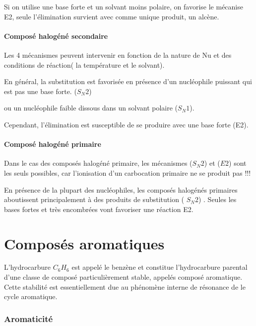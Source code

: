 Si on utilise une base forte et un solvant moins polaire, on favorise le mécanise E2, seule l'élimination survient avec comme unique produit, un alcène.


\subsection{Composé halogéné secondaire}

Les 4 mécanismes peuvent intervenir en fonction de la nature  de Nu et des conditions de réaction( la température et le solvant).

En général, la substitution est favorisée en présence d'un nucléophile puissant qui est pas une base forte.
($S_N2$)

ou un nucléophile faible dissous dans un solvant polaire  ($S_N1$).

Cependant, l'élimination est susceptible de se produire avec une base forte (E2).



\subsection{Composé halogéné primaire}

Dans le cas des composés halogéné primaire, les mécanismes ($S_N2$) et ($E2$) sont les seuls possibles, car l'ionisation d'un carbocation primaire ne se produit pas !!!

En présence de la plupart des  nucléophiles, les composés halogénés primaires aboutissent principalement à des produits de substitution ( $S_N2$) .
Seules les bases fortes et très encombrées vont favoriser une réaction E2.










\part{Composés aromatiques}
L'hydrocarbure $C_6H_6$ est appelé le benzène et constitue l'hydrocarbure parental d'une classe de composé particulièrement stable, appelés composé aromatique.
Cette stabilité est essentiellement due au phénomène interne de résonance de le cycle aromatique.

\section{Aromaticité}

